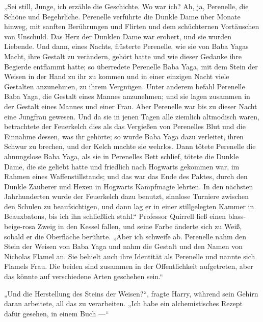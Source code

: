 „Sei still, Junge, ich erzähle die Geschichte. Wo war ich? Ah, ja, Perenelle, die Schöne und Begehrliche. Perenelle verführte die Dunkle Dame über Monate hinweg, mit sanften Berührungen und Flirten und dem schüchternen Vortäuschen von Unschuld. Das Herz der Dunklen Dame war erobert, und sie wurden Liebende. Und dann, eines Nachts, flüsterte Perenelle, wie sie von Baba Yagas Macht, ihre Gestalt zu verändern, gehört hatte und wie dieser Gedanke ihre Begierde entflammt hatte; so überredete Perenelle Baba Yaga, mit dem Stein der Weisen in der Hand zu ihr zu kommen und in einer einzigen Nacht viele Gestalten anzunehmen, zu ihrem Vergnügen. Unter anderem befahl Perenelle Baba Yaga, die Gestalt eines Mannes anzunehmen; und sie lagen zusammen in der Gestalt eines Mannes und einer Frau. Aber Perenelle war bis zu dieser Nacht eine Jungfrau gewesen. Und da sie in jenen Tagen alle ziemlich altmodisch waren, betrachtete der Feuerkelch dies als das Vergießen von Perenelles Blut und die Einnahme dessen, was ihr gehörte; so wurde Baba Yaga dazu verleitet, ihren Schwur zu brechen, und der Kelch machte sie wehrlos. Dann tötete Perenelle die ahnungslose Baba Yaga, als sie in Perenelles Bett schlief, tötete die Dunkle Dame, die sie geliebt hatte und friedlich nach Hogwarts gekommen war, im Rahmen eines Waffenstillstands; und das war das Ende des Paktes, durch den Dunkle Zauberer und Hexen in Hogwarts Kampfmagie lehrten. In den nächsten Jahrhunderten wurde der Feuerkelch dazu benutzt, sinnlose Turniere zwischen den Schulen zu beaufsichtigen, und dann lag er in einer stillgelegten Kammer in Beauxbatons, bis ich ihn schließlich stahl.“
Professor Quirrell ließ einen blass-beige-rosa Zweig in den Kessel fallen, und seine Farbe änderte sich zu Weiß, sobald er die Oberfläche berührte.
„Aber ich schweife ab. Perenelle nahm den Stein der Weisen von Baba Yaga und nahm die Gestalt und den Namen von Nicholas Flamel an. Sie behielt auch ihre Identität als Perenelle und nannte sich Flamels Frau. Die beiden sind zusammen in der Öffentlichkeit aufgetreten, aber das könnte auf verschiedene Arten geschehen sein.“

„Und die Herstellung des Steins der Weisen?“, fragte Harry, während sein Gehirn daran arbeitete, all das zu verarbeiten.
„Ich habe ein alchemistisches Rezept dafür gesehen, in einem Buch —“

